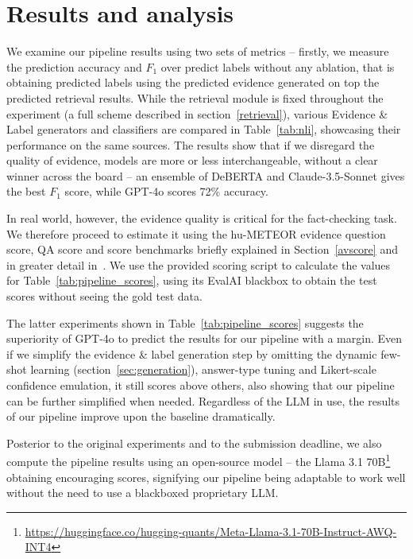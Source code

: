 
\section{Results and analysis}
\label{sec:results}

We examine our pipeline results using two sets of metrics -- firstly, we measure the prediction accuracy and $F_1$ over predict labels without any ablation, that is obtaining predicted labels using the predicted evidence generated on top the predicted retrieval results. 
While the retrieval module is fixed throughout the experiment (a full scheme described in section~\ref{retrieval}), various Evidence \& Label generators and classifiers are compared in Table~\ref{tab:nli}, showcasing their performance on the same sources.
The results show that if we disregard the quality of evidence, models are more or less interchangeable, without a clear winner across the board -- an ensemble of DeBERTA and Claude-3.5-Sonnet gives the best $F_1$ score, while GPT-4o scores 72\% accuracy.
\begin{table}\end{table}

\begin{table*}\end{table*}
In real world, however, the evidence quality is critical for the fact-checking task.
We therefore proceed to estimate it using the hu-METEOR evidence question score, QA score and \averitec{} score benchmarks briefly explained in Section~\ref{avscore} and in greater detail in~\cite{averitec2024}.
We use the provided \averitec{} scoring script to calculate the values for Table~\ref{tab:pipeline_scores}, using its EvalAI blackbox to obtain the test scores without seeing the gold test data.

The latter experiments shown in Table~\ref{tab:pipeline_scores} suggests the superiority of GPT-4o to predict the results for our pipeline with a margin.
Even if we simplify the evidence \& label generation step by omitting the dynamic few-shot learning (section~\ref{sec:generation}), answer-type tuning and Likert-scale confidence emulation, it still scores above others, also showing that our pipeline can be further simplified when needed.
Regardless of the LLM in use, the results of our pipeline improve upon the \averitec{} baseline dramatically.

Posterior to the original experiments and to the \averitec{} submission deadline, we also compute the pipeline results using an open-source model -- the Llama 3.1 70B\footnote{\url{https://huggingface.co/hugging-quants/Meta-Llama-3.1-70B-Instruct-AWQ-INT4}}~\cite{dubey2024llama3herdmodels} obtaining encouraging scores, signifying our pipeline being adaptable to work well without the need to use a blackboxed proprietary LLM.

